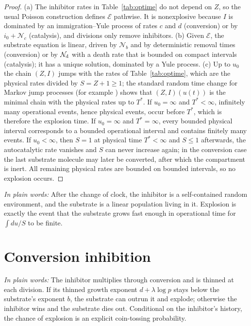 \documentclass[11pt,a4paper]{article}
\numberwithin{equation}{section}
\theoremstyle{definition}\newtheorem{definition}[theorem]{Definition}
\theoremstyle{remark}\newtheorem{remark}[theorem]{Remark}\newtheorem{example}[theorem]{Example}
\newcommand{\takeaway}[1]{\par\smallskip\noindent\textit{In plain words:} #1\par\smallskip}
\begin{document}
\begin{proof}
(a) The inhibitor rates in Table~\ref{tab:optime} do not depend on $Z$, so the usual Poisson construction defines $\mathcal E$ pathwise. It is nonexplosive because $I$ is dominated by an immigration--Yule process of rates $c$ and $d$ (conversion) or by $i_0+\mathcal N_c$ (catalysis), and divisions only remove inhibitors. (b) Given $\mathcal E$, the substrate equation is linear, driven by $\mathcal N_b$ and by deterministic removal times (conversion) or by $\mathcal N_{\rm d}$ with a death rate that is bounded on compact intervals (catalysis); it has a unique solution, dominated by a Yule process. (c) Up to $u_0$ the chain $(Z,I)$ jumps with the rates of Table~\ref{tab:optime}, which are the physical rates divided by $S=Z+1\ge1$; the standard random time change for Markov jump processes (for example \cite[Chapter~6]{EthierKurtz1986}) shows that $(Z,I)(u(t))$ is the minimal chain with the physical rates up to $T^*$. If $u_0=\infty$ and $T^*<\infty$, infinitely many operational events, hence physical events, occur before $T^*$, which is therefore the explosion time. If $u_0=\infty$ and $T^*=\infty$, every bounded physical interval corresponds to a bounded operational interval and contains finitely many events. If $u_0<\infty$, then $S=1$ at physical time $T^*<\infty$ and $S\le1$ afterwards, the autocatalytic rate vanishes and $S$ can never increase again; in the conversion case the last substrate molecule may later be converted, after which the compartment is inert. All remaining physical rates are bounded on bounded intervals, so no explosion occurs.
\end{proof}

\takeaway{After the change of clock, the inhibitor is a self-contained random environment, and the substrate is a linear population living in it. Explosion is exactly the event that the substrate grows fast enough in operational time for $\int du/S$ to be finite.}
\section{Conversion inhibition}\label{sec:conversion}
\takeaway{The inhibitor multiplies through conversion and is thinned at each division. If its thinned growth exponent $d+\lambda\log p$ stays below the substrate's exponent $b$, the substrate can outrun it and explode; otherwise the inhibitor wins and the substrate dies out. Conditional on the inhibitor's history, the chance of explosion is an explicit coin-tossing probability.}
\end{document}
